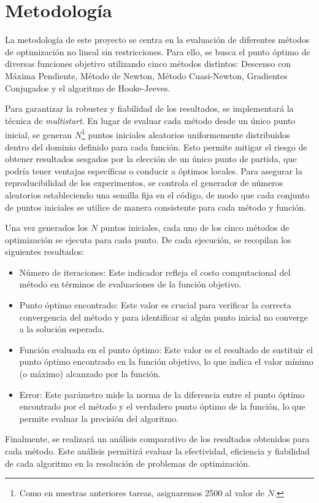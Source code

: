 \chapter{Metodología}

La metodología de este proyecto se centra en la evaluación de diferentes métodos de optimización no lineal sin restricciones. Para ello, se busca el punto óptimo de diversas funciones objetivo utilizando cinco métodos distintos: Descenso con Máxima Pendiente, Método de Newton, Método Cuasi-Newton, Gradientes Conjugados y el algoritmo de Hooke-Jeeves.

Para garantizar la robustez y fiabilidad de los resultados, se implementará la técnica de \emph{multistart}. En lugar de evaluar cada método desde un único punto inicial, se generan $N$\footnote{Como en nuestras anteriores tareas, asignaremos 2500 al valor de $N$.} puntos iniciales aleatorios uniformemente distribuidos dentro del dominio definido para cada función. Esto permite mitigar el riesgo de obtener resultados sesgados por la elección de un único punto de partida, que podría tener ventajas específicas o conducir a óptimos locales. Para asegurar la reproducibilidad de los experimentos, se controla el generador de números aleatorios estableciendo una semilla fija en el código, de modo que cada conjunto de puntos iniciales se utilice de manera consistente para cada método y función.

Una vez generados los $N$ puntos iniciales, cada uno de los cinco métodos de optimización se ejecuta para cada punto. De cada ejecución, se recopilan los siguientes resultados:
\begin{itemize}
    \item Número de iteraciones: Este indicador refleja el costo computacional del método en términos de evaluaciones de la función objetivo.
    \item Punto óptimo encontrado: Este valor es crucial para verificar la correcta convergencia del método y para identificar si algún punto inicial no converge a la solución esperada.
    \item Función evaluada en el punto óptimo: Este valor es el resultado de sustituir el punto óptimo encontrado en la función objetivo, lo que indica el valor mínimo (o máximo) alcanzado por la función.
    \item Error: Este parámetro mide la norma de la diferencia entre el punto óptimo encontrado por el método y el verdadero punto óptimo de la función, lo que permite evaluar la precisión del algoritmo.
\end{itemize}
Finalmente, se realizará un análisis comparativo de los resultados obtenidos para cada método. Este análisis permitirá evaluar la efectividad, eficiencia y fiabilidad de cada algoritmo en la resolución de problemas de optimización.

